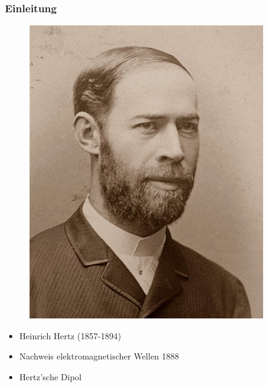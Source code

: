 \begin{frame}
  \frametitle{Einleitung}
  \begin{minipage}{0.49\textwidth}
    \begin{figure}
      \includegraphics[width=0.9\textwidth,height=.8\textheight,keepaspectratio]{e11/HEINRICH_HERTZ.jpg}
    \end{figure}
  \end{minipage}
  \begin{minipage}{0.49\textwidth}
    \begin{itemize}
      \item Heinrich Hertz (1857-1894)
      \item Nachweis elektromagnetischer Wellen 1888
      \item Hertz'sche Dipol
    \end{itemize}
  \end{minipage}
\end{frame}

